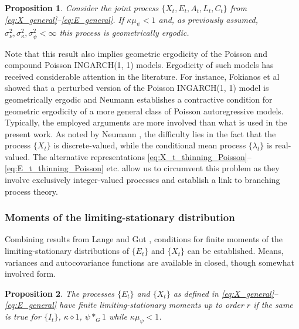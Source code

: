 \documentclass{article}
\newtheorem{proposition}{Proposition}
\begin{document}
\begin{proposition}
Consider the joint process $\{X_t, E_t, A_t, L_t, C_t\}$ from \eqref{eq:X_general}--\eqref{eq:E_general}. If $\kappa\mu_\psi < 1$ and, as previously assumed, $\sigma^2_\nu, \sigma^2_\kappa, \sigma^2_\psi < \infty$ this process is geometrically ergodic.
\end{proposition}
Note that this result also implies geometric ergodicity of the Poisson and compound Poisson INGARCH(1, 1) models. Ergodicity of such models has received considerable attention in the literature. For instance, Fokianos et al \cite{Fokianos2009} showed that a perturbed version of the Poisson INGARCH(1, 1) model is geometrically ergodic and Neumann \cite[Theorem 3.1]{Neumann2011} establishes a contractive condition for geometric ergodicity of a more general class of Poisson autoregressive models. Typically, the employed arguments are more involved than what is used in the present work. As noted by Neumann \cite{Neumann2011}, the difficulty lies in the fact that the process $\{X_t\}$ is discrete-valued, while the conditional mean process $\{\lambda_t\}$ is real-valued. The alternative representations \eqref{eq:X_t_thinning_Poisson}--\eqref{eq:E_t_thinning_Poisson} etc. allow us to circumvent this problem as they involve exclusively integer-valued processes and establish a link to branching process theory.

\subsubsection{Moments of the limiting-stationary distribution}
\label{subsec:moments_general}

Combining results from Lange \cite[Sec. 4]{Lange1981} and Gut \cite[Theorem 5.2]{Gut2009}, conditions for finite moments of the limiting-stationary distributions of $\{E_t\}$ and $\{X_t\}$ can be established. Means, variances and autocovariance functions are available in closed, though somewhat involved form. 

\begin{proposition}
The processes $\{E_t\}$ and $\{X_t\}$  as defined in \eqref{eq:X_general}--\eqref{eq:E_general} have finite limiting-stationary moments up to order $r$ if the same is true for $\{I_t\}$, $\kappa \diamond 1$, $\psi *_G 1$ while $\kappa\mu_\psi < 1$.
\end{proposition}
\end{document}
